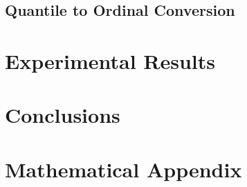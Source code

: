 \documentclass[AER]{AEA}
\begin{document}
\subsection{Quantile to Ordinal Conversion}
\section{Experimental Results}
\section{Conclusions}




\appendix

\section{Mathematical Appendix}
\end{document}
